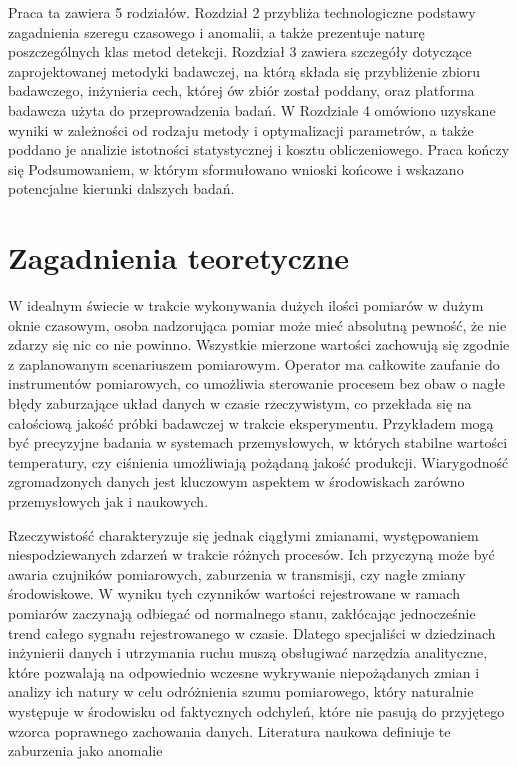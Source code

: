 \documentclass[a4paper,twoside,12pt]{book}
\begin{document}
	Praca ta zawiera 5 rodziałów. Rozdział 2 przybliża technologiczne podstawy zagadnienia szeregu czasowego i anomalii, a także prezentuje naturę poszczególnych klas metod detekcji. Rozdział 3 zawiera szczegóły dotyczące zaprojektowanej metodyki badawczej, na którą składa się przybliżenie zbioru badawczego, inżynieria cech, której ów zbiór został poddany, oraz platforma badawcza użyta do przeprowadzenia badań. W Rozdziale 4 omówiono uzyskane wyniki w zależności od rodzaju metody i optymalizacji parametrów, a także poddano je analizie istotności statystycznej i kosztu obliczeniowego. Praca kończy się Podsumowaniem, w którym sformułowano wnioski końcowe i wskazano potencjalne kierunki dalszych badań. 
	

	
	
	\chapter{Zagadnienia teoretyczne}
	W idealnym świecie w trakcie wykonywania dużych ilości pomiarów w dużym oknie czasowym, osoba nadzorująca pomiar może mieć absolutną pewność, że nie zdarzy się nic co nie powinno. Wszystkie mierzone wartości zachowują się zgodnie z zaplanowanym scenariuszem pomiarowym. Operator ma całkowite zaufanie do instrumentów pomiarowych, co umożliwia sterowanie procesem bez obaw o nagłe błędy zaburzające układ danych w czasie rzeczywistym, co przekłada się na całościową jakość próbki badawczej w trakcie eksperymentu. Przykładem mogą być precyzyjne badania w systemach przemysłowych, w których stabilne wartości temperatury, czy ciśnienia umożliwiają pożądaną jakość produkcji. Wiarygodność zgromadzonych danych jest kluczowym aspektem w środowiskach zarówno przemysłowych jak i naukowych. 
	
	Rzeczywistość charakteryzuje się jednak ciągłymi zmianami, występowaniem niespodziewanych zdarzeń w trakcie różnych procesów. Ich przyczyną może być awaria czujników pomiarowych, zaburzenia w transmisji, czy nagłe zmiany środowiskowe. W wyniku tych czynników wartości rejestrowane w ramach pomiarów zaczynają odbiegać od normalnego stanu, zakłócając jednocześnie trend całego sygnału rejestrowanego w czasie. Dlatego specjaliści w dziedzinach inżynierii danych i utrzymania ruchu muszą obsługiwać narzędzia analityczne, które pozwalają na odpowiednio wczesne wykrywanie niepożądanych zmian i analizy ich natury w celu odróżnienia szumu pomiarowego, który naturalnie występuje w środowisku od faktycznych odchyleń, które nie pasują do przyjętego wzorca poprawnego zachowania danych. Literatura naukowa definiuje te zaburzenia jako anomalie\cite{chandola2009anomaly}
	
\end{document}
